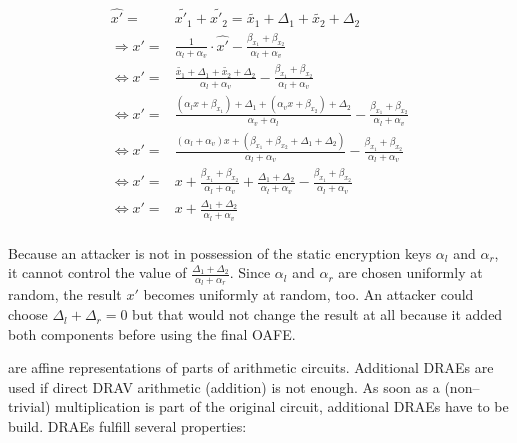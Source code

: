\begin{align*}
  \widehat{x'} = & \widetilde{x'_1} + \widetilde{x'_2} = \widetilde{x_1} +
  \Delta_1 + \widetilde{x_2} + \Delta_2 \\
  \Rightarrow x' = & \frac{1}{\alpha_l + \alpha_v} \cdot \widehat{x'} -
  \frac{\beta_{x_1} +
  \beta_{x_2}}{\alpha_l + \alpha_v} \\
  \Leftrightarrow x' = & \frac{\widetilde{x_1} + \Delta_1 +
  \widetilde{x_2} + \Delta_2}{\alpha_l + \alpha_v} -
  \frac{\beta_{x_1} +\beta_{x_2}}{\alpha_l + \alpha_v}\\
  \Leftrightarrow x' = & \frac{(\alpha_l x + \beta_{x_1}) + \Delta_1 +
  (\alpha_v x + \beta_{x_2}) + \Delta_2}{\alpha_v + \alpha_l} -
  \frac{\beta_{x_1} +\beta_{x_2}}{\alpha_l + \alpha_v} \\
  \Leftrightarrow x' = & \frac{(\alpha_l+\alpha_v)x + (\beta_{x_1}+\beta_{x_2} +
  \Delta_1+\Delta_2)}{\alpha_l+\alpha_v} -
  \frac{\beta_{x_1} +\beta_{x_2}}{\alpha_l + \alpha_v} \\
  \Leftrightarrow x' = & x + \frac{\beta_{x_1}+\beta_{x_2}}{\alpha_l+\alpha_v}
  + \frac{\Delta_1 + \Delta_2}{\alpha_l + \alpha_v} -
  \frac{\beta_{x_1}+\beta_{x_2}}{\alpha_l + \alpha_v} \\
  \Leftrightarrow x' = & x + \frac{\Delta_1 + \Delta_2}{\alpha_l + \alpha_v}\\
\end{align*}

Because an attacker is not in possession of the static encryption keys
$\alpha_l$ and $\alpha_r$, it cannot control the value of $\frac{\Delta_1 +
\Delta_2}{\alpha_l + \alpha_r}$. Since $\alpha_l$ and $\alpha_r$ are chosen
uniformly at random, the result $x'$ becomes uniformly at random, too. An
attacker could choose $\Delta_l + \Delta_r = 0$ but that would not change the
result at all because it added both components before using the final OAFE.


%
%
\label{sec:drae}

 are affine representations of
parts of arithmetic circuits. Additional DRAEs are used if direct DRAV
arithmetic (addition) is not enough. As soon as a (non--trivial) multiplication
is part of the original circuit, additional DRAEs have to be build. DRAEs
fulfill several properties:

